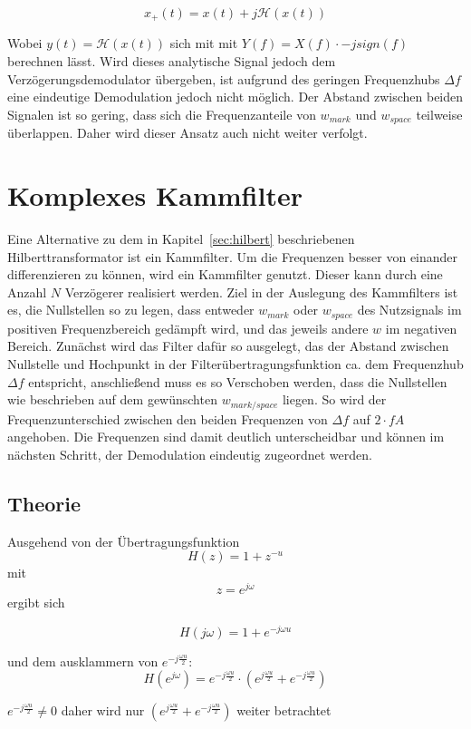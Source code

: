 \documentclass{article}
\begin{document}
$$ 
x_+(t) = x(t) + j \mathcal{H}(x(t))
$$

Wobei $y(t) = \mathcal{H}(x(t))$ sich mit mit $Y(f) = X(f) \cdot -j sign(f)$ berechnen lässt.
Wird dieses analytische Signal jedoch dem Verzögerungsdemodulator übergeben, ist aufgrund des 
geringen Frequenzhubs $\varDelta f$ eine eindeutige Demodulation jedoch nicht möglich. Der Abstand zwischen beiden Signalen ist so gering, dass sich die 
Frequenzanteile von $w_{mark}$ und $w_{space}$ teilweise überlappen. Daher wird
dieser Ansatz auch nicht weiter verfolgt.


\section{Komplexes Kammfilter}\label{sec:comb}
Eine Alternative zu dem in Kapitel~\ref{sec:hilbert} beschriebenen Hilberttransformator ist ein Kammfilter.
Um die Frequenzen besser von einander differenzieren zu können, wird ein Kammfilter genutzt. Dieser kann durch eine Anzahl $N$ Verzögerer realisiert werden.
Ziel in der Auslegung des Kammfilters ist es, die Nullstellen so zu legen, dass entweder $w_{mark}$ oder $w_{space}$ des Nutzsignals im positiven Frequenzbereich
gedämpft wird, und das jeweils andere $w$ im negativen Bereich. Zunächst wird das Filter dafür so ausgelegt, das der Abstand zwischen
Nullstelle und Hochpunkt in der Filterübertragungsfunktion ca. dem Frequenzhub $\varDelta f$ entspricht, anschließend muss es so Verschoben werden, dass die Nullstellen wie beschrieben auf dem
gewünschten $w_{mark/space}$ liegen.
So wird der Frequenzunterschied zwischen den beiden Frequenzen von $\varDelta f$ auf $2\cdot fA$ angehoben.
Die Frequenzen sind damit deutlich unterscheidbar und können im nächsten Schritt, der Demodulation eindeutig zugeordnet werden. 

\subsection{Theorie}


Ausgehend von der Übertragungsfunktion 
$$H(z) = 1 + z^{-u}$$ 
mit 
$$ z = e^{j\omega} $$
ergibt sich

$$H(j\omega) = 1 + e^{-j\omega u}$$

und dem ausklammern von $ e^{-j \frac{\omega u}{2}}$:
$$
H(e^{j\omega}) = e^{-j \frac{\omega u}{2}} \cdot (e^{j \frac{\omega u}{2}} + e^{-j \frac{\omega u}{2}})
$$

$e^{-j \frac{\omega u}{2}} \neq 0$ daher wird nur $(e^{j \frac{\omega u}{2}} + e^{-j \frac{\omega u}{2}})$ weiter betrachtet
\end{document}

